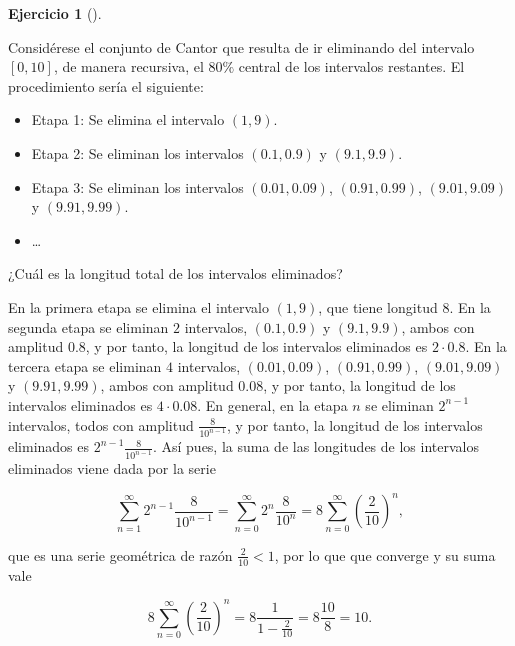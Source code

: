 \documentclass[
  spanish,
  a4paper,
]{scrreport}
\providecommand{\tightlist}{%
  \setlength{\itemsep}{0pt}\setlength{\parskip}{0pt}}
\theoremstyle{definition}
\newtheorem{exercise}{Ejercicio}[chapter]
\theoremstyle{remark}
\begin{document}
\begin{exercise}[]\protect\hypertarget{exr-2}{}\label{exr-2}

Considérese el conjunto de Cantor que resulta de ir eliminando del
intervalo \([0,10]\), de manera recursiva, el \(80\%\) central de los
intervalos restantes. El procedimiento sería el siguiente:

\begin{itemize}
\tightlist
\item
  Etapa 1: Se elimina el intervalo \((1,9)\).
\item
  Etapa 2: Se eliminan los intervalos \((0.1,0.9)\) y \((9.1,9.9)\).
\item
  Etapa 3: Se eliminan los intervalos \((0.01,0.09)\), \((0.91,0.99)\),
  \((9.01,9.09)\) y \((9.91,9.99)\).
\item
  \ldots{}
\end{itemize}

¿Cuál es la longitud total de los intervalos eliminados?

\end{exercise}

\begin{tcolorbox}[enhanced jigsaw, arc=.35mm, bottomrule=.15mm, bottomtitle=1mm, breakable, colback=white, colbacktitle=quarto-callout-tip-color!10!white, colframe=quarto-callout-tip-color-frame, coltitle=black, left=2mm, leftrule=.75mm, opacityback=0, opacitybacktitle=0.6, rightrule=.15mm, title=\textcolor{quarto-callout-tip-color}{\faLightbulb}\hspace{0.5em}{Solución}, titlerule=0mm, toprule=.15mm, toptitle=1mm]

En la primera etapa se elimina el intervalo \((1,9)\), que tiene
longitud \(8\). En la segunda etapa se eliminan \(2\) intervalos,
\((0.1,0.9)\) y \((9.1,9.9)\), ambos con amplitud \(0.8\), y por tanto,
la longitud de los intervalos eliminados es \(2\cdot 0.8\). En la
tercera etapa se eliminan \(4\) intervalos, \((0.01,0.09)\),
\((0.91,0.99)\), \((9.01,9.09)\) y \((9.91,9.99)\), ambos con amplitud
\(0.08\), y por tanto, la longitud de los intervalos eliminados es
\(4\cdot 0.08\). En general, en la etapa \(n\) se eliminan \(2^{n-1}\)
intervalos, todos con amplitud \(\frac{8}{10^{n-1}}\), y por tanto, la
longitud de los intervalos eliminados es \(2^{n-1}\frac{8}{10^{n-1}}\).
Así pues, la suma de las longitudes de los intervalos eliminados viene
dada por la serie

\[
\sum_{n=1}^\infty 2^{n-1}\frac{8}{10^{n-1}} 
= \sum_{n=0}^\infty 2^n\frac{8}{10^n} 
= 8\sum_{n=0}^\infty \left(\frac{2}{10}\right)^n,
\]

que es una serie geométrica de razón \(\frac{2}{10}<1\), por lo que que
converge y su suma vale

\[
8\sum_{n=0}^\infty \left(\frac{2}{10}\right)^n 
= 8 \frac{1}{1-\frac{2}{10}} 
= 8 \frac{10}{8} 
= 10.
\]

\end{tcolorbox}
\end{document}
